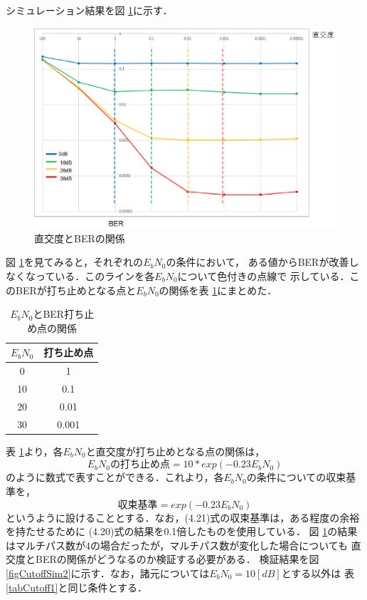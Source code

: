 シミュレーション結果を図 \ref{figCutoffSim1}に示す．

\begin{figure}[ht]
    \centering
    \includegraphics[width=0.95\linewidth]{chapter4/figure/CutoffSim1.eps}
    \caption{直交度とBERの関係}
    \label{figCutoffSim1}
\end{figure}

図 \ref{figCutoffSim1}を見てみると，それぞれの$E_bN_0$の条件において，
ある値からBERが改善しなくなっている．このラインを各$E_bN_0$について色付きの点線で
示している．このBERが打ち止めとなる点と$E_bN_0$の関係を表 \ref{tabCutoff2}にまとめた．

\begin{table}[ht]
    \begin{tabular}{|c|c|} \hline
        $E_bN_0$ & 打ち止め点 \\ \hline
        0 & 1 \\ \hline
        10 & 0.1 \\ \hline
        20 & 0.01 \\ \hline
        30 & 0.001 \\ \hline
    \end{tabular}
    \centering
    \caption{$E_bN_0$とBER打ち止め点の関係}
    \label{tabCutoff2}
\end{table}

表 \ref{tabCutoff2}より，各$E_bN_0$と直交度が打ち止めとなる点の関係は，
\begin{equation}
    E_bN_0の打ち止め点 = 10*exp(-0.23E_bN_0)
\end{equation}
のように数式で表すことができる．これより，各$E_bN_0$の条件についての収束基準を，
\begin{equation}
    収束基準 = exp(-0.23E_bN_0)
\end{equation}
というように設けることとする．なお，(4.21)式の収束基準は，ある程度の余裕を持たせるために
(4.20)式の結果を0.1倍したものを使用している．
図 \ref{figCutoffSim1}の結果はマルチパス数が4の場合だったが，マルチパス数が変化した場合についても
直交度とBERの関係がどうなるのか検証する必要がある．
検証結果を図 \ref{figCutoffSim2}に示す．なお，諸元については$E_bN_0=10[dB]$とする以外は
表 \ref{tabCutoff1}と同じ条件とする．

